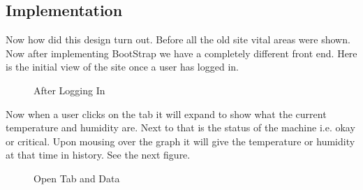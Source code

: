 \documentclass{report}
\begin{document}
\subsection*{Implementation}
Now how did this design turn out. Before all the old site vital areas were shown. Now after implementing BootStrap we have a completely different front end.
Here is the initial view of the site once a user has logged in.
\begin{figure}[H]
	\caption{After Logging In}
\end{figure}
\newpage
Now when a user clicks on the tab it will expand to show what the current temperature and humidity are. Next to that is the status of the machine i.e. okay or critical. Upon mousing over the graph it will give the temperature or humidity at that time in history. See the next figure.
\begin{figure}[H]
	\caption{Open Tab and Data}
\end{figure}
\end{document}

